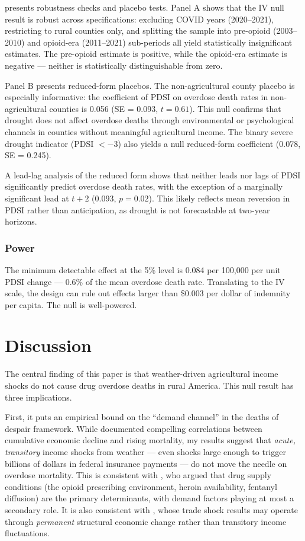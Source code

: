\documentclass[12pt]{article}
\begin{document}
 presents robustness checks and placebo tests. Panel A shows that the IV null result is robust across specifications: excluding COVID years (2020--2021), restricting to rural counties only, and splitting the sample into pre-opioid (2003--2010) and opioid-era (2011--2021) sub-periods all yield statistically insignificant estimates. The pre-opioid estimate is positive, while the opioid-era estimate is negative --- neither is statistically distinguishable from zero.

Panel B presents reduced-form placebos. The non-agricultural county placebo is especially informative: the coefficient of PDSI on overdose death rates in non-agricultural counties is 0.056 (SE = 0.093, $t = 0.61$). This null confirms that drought does not affect overdose deaths through environmental or psychological channels in counties without meaningful agricultural income. The binary severe drought indicator (PDSI $< -3$) also yields a null reduced-form coefficient (0.078, SE = 0.245).

A lead-lag analysis of the reduced form shows that neither leads nor lags of PDSI significantly predict overdose death rates, with the exception of a marginally significant lead at $t+2$ (0.093, $p = 0.02$). This likely reflects mean reversion in PDSI rather than anticipation, as drought is not forecastable at two-year horizons.

\subsubsection*{Power} The minimum detectable effect at the 5\% level is 0.084 per 100,000 per unit PDSI change --- 0.6\% of the mean overdose death rate. Translating to the IV scale, the design can rule out effects larger than \$0.003 per dollar of indemnity per capita. The null is well-powered.

\section{Discussion}

The central finding of this paper is that weather-driven agricultural income shocks do not cause drug overdose deaths in rural America. This null result has three implications.

First, it puts an empirical bound on the ``demand channel'' in the deaths of despair framework. While \citet{case2020deaths} documented compelling correlations between cumulative economic decline and rising mortality, my results suggest that \textit{acute, transitory} income shocks from weather --- even shocks large enough to trigger billions of dollars in federal insurance payments --- do not move the needle on overdose mortality. This is consistent with \citet{ruhm2019drivers}, who argued that drug supply conditions (the opioid prescribing environment, heroin availability, fentanyl diffusion) are the primary determinants, with demand factors playing at most a secondary role. It is also consistent with \citet{pierce2020trade}, whose trade shock results may operate through \textit{permanent} structural economic change rather than transitory income fluctuations.
\end{document}
